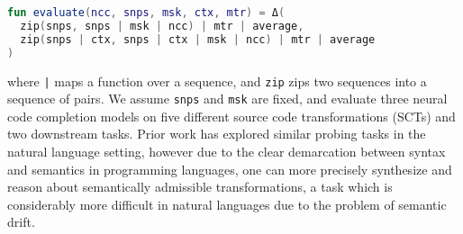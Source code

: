 \documentclass[11pt]{article}
\begin{document}
  \noindent\begin{lstlisting}[basicstyle=\footnotesize\ttfamily, language=kotlin,label={lst:lstlisting}]
fun evaluate(ncc, snps, msk, ctx, mtr) = Δ(
  zip(snps, snps | msk | ncc) | mtr | average,
  zip(snps | ctx, snps | ctx | msk | ncc) | mtr | average
)
  \end{lstlisting}

  \noindent where \texttt{|} maps a function over a sequence, and \lstinline|zip| zips two sequences into a sequence of pairs. We assume \lstinline|snps| and \lstinline|msk| are fixed, and evaluate three neural code completion models on five different source code transformations (SCTs) and two downstream tasks. Prior work has explored similar probing tasks in the natural language setting, however due to the clear demarcation between syntax and semantics in programming languages, one can more precisely synthesize and reason about semantically admissible transformations, a task which is considerably more difficult in natural languages due to the problem of semantic drift.
\end{document}
